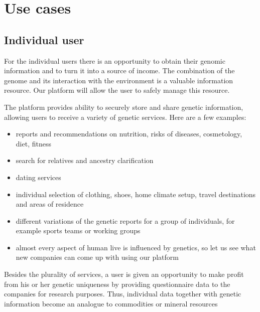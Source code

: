 \section{Use cases}
\subsection{Individual user }
For the individual users there is an opportunity to obtain their genomic information and to turn it into a source of income. The combination of the genome and its interaction with the environment is a valuable information resource. Our platform will allow the user to safely manage this resource.

The platform provides ability to securely store and share genetic information, allowing users to receive a variety of genetic services. Here are a few examples:
\begin{itemize}
\item reports and recommendations on nutrition, risks of diseases, cosmetology, diet, fitness
\item search for relatives and ancestry clarification
\item dating services
\item individual selection of clothing, shoes, home climate setup, travel destinations and areas of residence
\item different variations of the genetic reports for a group of individuals, for example sports teams or working groups
\item almost every aspect of human live is influenced by genetics, so let us see what new companies can come up with using our platform
\end{itemize}

Besides the plurality of services, a user is given an opportunity to make profit from his or her genetic uniqueness by providing questionnaire data to the companies for research purposes. Thus, individual data together with genetic information become an analogue to commodities or mineral resources

